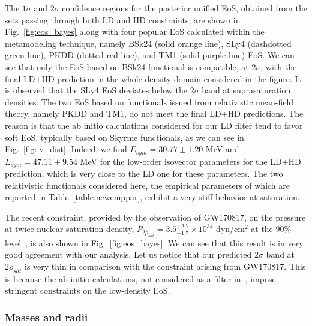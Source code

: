 The $1\sigma$ and $2\sigma$ confidence regions for the posterior unified EoS,
obtained from the sets passing through both LD and HD constraints, are shown in
Fig.~\ref{fig:eos_bayes} along with four popular EoS calculated within the
metamodeling technique, namely BSk24 (solid orange line), SLy4 (dashdotted
green line), PKDD (dotted red line), and TM1 (solid purple line) EoS. 
We can see that only the EoS based on BSk24 functional is
compatible, at $2\sigma$, with the final LD+HD prediction in the whole density 
domain considered in the figure. It is observed that the SLy4 EoS deviates
below the $2\sigma$ band at suprasaturation densities.
The two EoS based on functionals issued from relativistic mean-field theory, 
namely PKDD and TM1, do not meet the final LD+HD predictions. The reason is 
that the ab initio calculations considered for our LD filter 
\cite{Drischler2016} tend to favor soft EoS, typically based on Skyrme
functionals, as we can see in Fig.~\ref{fig:iv_dist}. Indeed, we find $E_{sym}
= 30.77 \pm 1.20$ MeV and $L_{sym} = 47.11 \pm 9.54$ MeV for the low-order
isovector parameters for the LD+HD prediction, which is very close to the LD
one for these parameters. The two relativistic functionals considered
here, the empirical parameters of which are reported in
Table~\ref{table:newemppar}, exhibit a very stiff behavior at saturation.
 
The recent constraint, provided by the observation of GW170817, on 
the pressure at twice nuclear saturation density, $P_{2\rho_{sat}} =
3.5_{-1.7}^{+2.7}\times 10^{34}$ dyn/cm$^2$ at the $90\%$ level~\cite{GW1}, is 
also shown in Fig.~\ref{fig:eos_bayes}. We can see that this result is in very 
good agreement with our analysis. Let us notice that our predicted $2\sigma$ 
band at $2\rho_{sat}$ is very thin in comparison with the constraint 
arising from GW170817. This is because the ab initio calculations, not 
considered as a filter in~\cite{GW1}, impose stringent constraints on the 
low-density EoS.
%

\subsubsection{Masses and radii} %

